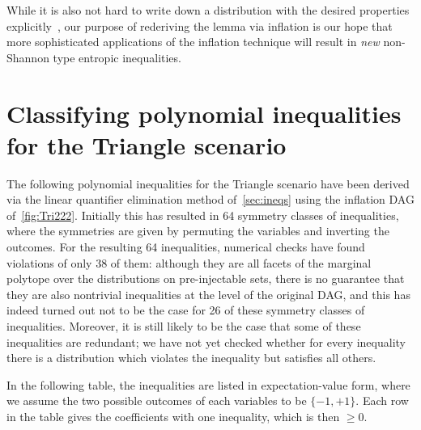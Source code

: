 While it is also not hard to write down a distribution with the desired properties explicitly~\cite[Lemma~15.8]{yeung_network_2008}, our purpose of rederiving the lemma via inflation is our hope that more sophisticated applications of the inflation technique will result in \emph{new} non-Shannon type entropic inequalities.


\section{Classifying polynomial inequalities for the Triangle scenario}
\label{sec:38ineqs}

The following polynomial inequalities for the Triangle scenario have been derived via the linear quantifier elimination method of~\cref{sec:ineqs} using the inflation DAG of~\cref{fig:Tri222}. Initially this has resulted in 64 symmetry classes of inequalities, where the symmetries are given by permuting the variables and inverting the outcomes. For the resulting 64 inequalities, numerical checks have found violations of only 38 of them: although they are all facets of the marginal polytope over the distributions on pre-injectable sets, there is no guarantee that they are also nontrivial inequalities at the level of the original DAG, and this has indeed turned out not to be the case for 26 of these symmetry classes of inequalities. Moreover, it is still likely to be the case that some of these inequalities are redundant; we have not yet checked whether for every inequality there is a distribution which violates the inequality but satisfies all others.

In the following table, the inequalities are listed in expectation-value form, where we assume the two possible outcomes of each variables to be $\{-1,+1\}$. Each row in the table gives the coefficients with one inequality, which is then $\geq 0$.

